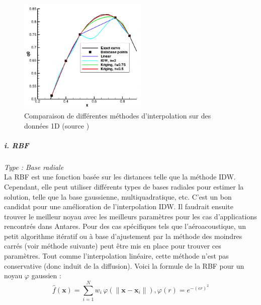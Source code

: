 
\begin{figure}[H]
    \centering
    \includegraphics[width=0.55\textwidth]{images/palmer2009_comp_copie.png}
    \caption{Comparaison de différentes méthodes d'interpolation sur des données 1D (source \cite{palmer2009})}
    \label{fig:compar}
\end{figure}

\subparagraph{i. RBF \cite{opencfs}}
\textit{Type : Base radiale} \\
\phantom{----}La \ac{RBF} est une fonction basée sur les distances telle que la méthode IDW. Cependant, elle peut utiliser différents types de bases radiales pour estimer la solution, telle que la base gaussienne, multiquadratique, etc. C'est un bon candidat pour une amélioration de l'interpolation IDW. Il faudrait ensuite trouver le meilleur noyau avec les meilleurs paramètres pour les cas d'applications rencontrés dans Antares. Pour des cas spécifiques tels que l'aéroacoustique, un petit algorithme itératif ou à base d'ajustement par la méthode des moindres carrés (voir méthode suivante) peut être mis en place pour trouver ces paramètres. Tout comme l'interpolation linéaire, cette méthode n'est pas conservative (donc induit de la diffusion).
Voici la formule de la RBF pour un noyau \(\varphi\) gaussien :
\begin{equation}
    \hat{f}(\mathbf{x}) = \sum_{i=1}^{N} w_{i} \, \varphi \left( \|\mathbf{x} - \mathbf{x}_{i}\| \right), \varphi(r) = e^{-(\epsilon r)^{2}}
\end{equation}

